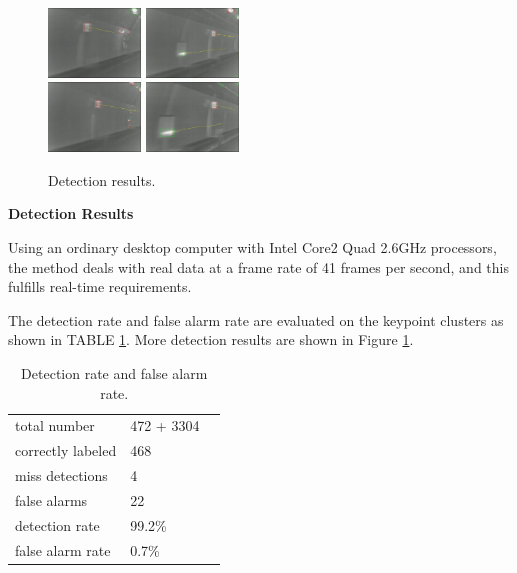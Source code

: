 \documentclass{JoITSRstyle}
\begin{document}
\begin{figure}
{
\includegraphics[width=0.22\textwidth,bb=0 0 640 480]{17veriTrjimg00039.ps}
}
{
\includegraphics[width=0.22\textwidth,bb=0 0 640 480]{8veriTrjimg00028.ps}
}\\
{
\includegraphics[width=0.22\textwidth,bb=0 0 640 480]{19veriTrjimg00041.ps}
}
{
\includegraphics[width=0.22\textwidth,bb=0 0 640 480]{3veriTrjimg00023.ps}
}
\caption{Detection results.}
\label{fig:sixs}
\end{figure}

\textbf{Detection Results}

Using an ordinary desktop computer with Intel Core2 Quad 2.6GHz processors, the method deals with real data at a frame rate of 41 frames per second, and this fulfills real-time requirements.


The detection rate and false alarm rate are evaluated on the keypoint clusters as shown in TABLE \ref{tb:tb2}.
More detection results are shown in Figure \ref{fig:sixs}.
\begin{table}[h]
\centering
\begin{tabular}{lll}
     \hline
     \hline
    total number &	472 + 3304  \\
    correctly labeled &	468   \\
    miss detections &	4 &	  \\
    false alarms &	22    \\
    detection rate &	99.2\% &	  \\
    false alarm rate &	0.7\% &	   \\
   \hline
\end{tabular}
\caption{Detection rate and false alarm rate.}\label{tb:tb2}
\end{table}
\end{document}
